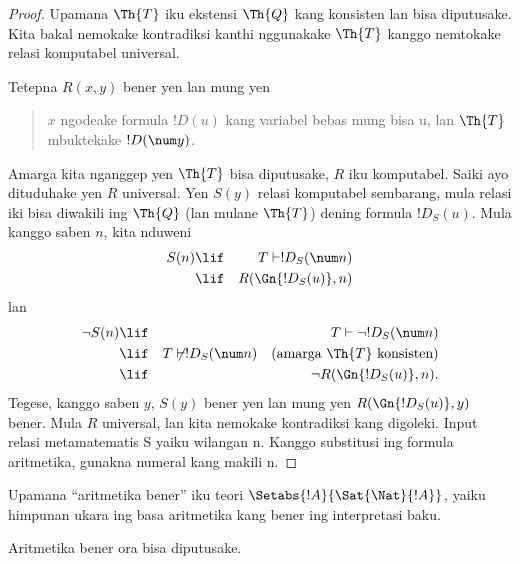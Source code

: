 \documentclass[../../../include/open-logic-section]{subfiles}
\begin{document}
\begin{proof}
Upamana $\Th{T}$ iku ekstensi $\Th{Q}$ kang konsisten lan bisa
diputusake. Kita bakal nemokake kontradiksi kanthi nggunakake $\Th{T}$
kanggo nemtokake relasi komputabel universal.

Tetepna $R(x,y)$ bener yen lan mung yen
\begin{quote}
$x$ ngodeake formula $!D(u)$ kang variabel bebas mung bisa u, lan $\Th{T}$ mbuktekake $!D(\num y)$.
\end{quote}
Amarga kita nganggep yen $\Th{T}$ bisa diputusake, $R$ iku komputabel.
Saiki ayo dituduhake yen $R$ universal. Yen $S(y)$ relasi komputabel
sembarang, mula relasi iki bisa diwakili ing $\Th{Q}$
(lan mulane $\Th{T}$) dening formula $!D_S(u)$. Mula kanggo saben $n$,
kita nduweni
\begin{eqnarray*}
S(n) & \lif & T \vdash !D_S(\num n) \\
& \lif & R(\Gn{!D_S(u)}, n)
\end{eqnarray*}
lan
\begin{eqnarray*}
\lnot S(n) & \lif & T \vdash \lnot !D_S(\num n) \\
& \lif & T \not\vdash !D_S(\num n) \quad \text{(amarga $\Th{T}$
  konsisten)} \\
& \lif & \lnot R(\Gn{!D_S(u)}, n).
\end{eqnarray*}
Tegese, kanggo saben $y$, $S(y)$ bener yen lan mung yen
$R(\Gn{!D_S(u)}, y)$ bener. Mula $R$ universal, lan kita nemokake
kontradiksi kang digoleki. Input relasi metamatematis S yaiku wilangan n. Kanggo substitusi ing formula aritmetika, gunakna numeral kang makili n.
\end{proof}

Upamana ``aritmetika bener'' iku teori $\Setabs{!A}{ \Sat{\Nat}{!A}}$,
yaiku himpunan ukara ing basa aritmetika kang bener ing interpretasi
baku.

\begin{cor}
Aritmetika bener ora bisa diputusake.
\end{cor}

\end{document}
